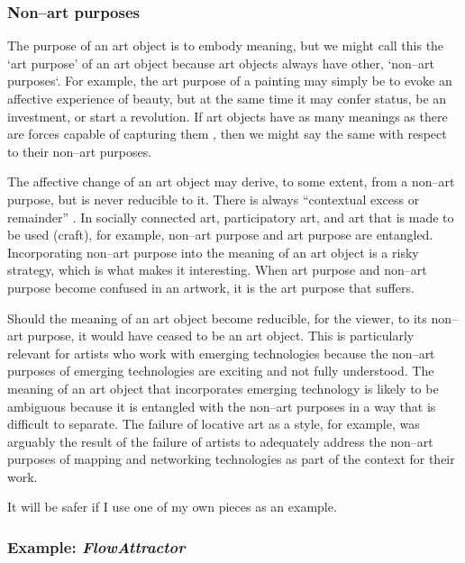 \documentclass[letterpaper]{article}
\begin{document}
    \subsubsection{Non–art purposes}

    The purpose of an art object is to embody meaning, but we might call this the ‘art purpose’ of an art object because art objects always have other, ‘non–art purposes‘. For example, the art purpose of a painting may simply be to evoke an affective experience of beauty, but at the same time it may confer status, be an investment, or start a revolution. If art objects have as many meanings as there are forces capable of capturing them \citep[p.4]{DeleuzeNtschAndPhlsphy2006}, then we might say the same with respect to their non–art purposes.

    The affective change of an art object may derive, to some extent, from a non–art purpose, but is never reducible to it. There is always “contextual excess or remainder” \citep[p.252]{MassumiPrblsFrThVrtl2002}. In socially connected art, participatory art, and art that is made to be used (craft), for example, non–art purpose and art purpose are entangled. Incorporating non–art purpose into the meaning of an art object is a risky strategy, which is what makes it interesting. When art purpose and non–art purpose become confused in an artwork, it is the art purpose that suffers. 
    
    Should the meaning of an art object become reducible, for the viewer, to its non–art purpose, it would have ceased to be an art object. This is particularly relevant for artists who work with emerging technologies because the non–art purposes of emerging technologies are exciting and not fully understood. The meaning of an art object that incorporates emerging technology is likely to be ambiguous because it is entangled with the non–art purposes in a way that is difficult to separate. The failure of locative art as a style, for example, was arguably the result of the failure of artists to adequately address the non–art purposes of mapping and networking technologies \citep{questioningTheFrame2004} as part of the context for their work.

    It will be safer if I use one of my own pieces as an example.

    \subsubsection{Example: \emph{FlowAttractor}}
\end{document}
